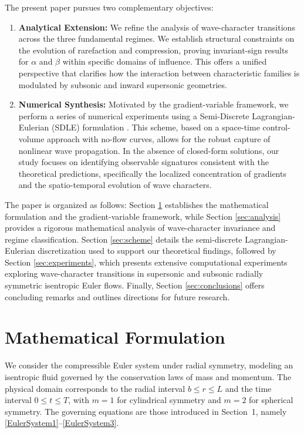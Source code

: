\documentclass[11pt]{article}
\begin{document}
The present paper pursues two complementary objectives:
\begin{enumerate}
    \item \textbf{Analytical Extension:} We refine the analysis of wave-character transitions across the three fundamental regimes. We establish structural constraints on the evolution of rarefaction and compression, proving invariant-sign results for $\alpha$ and $\beta$ within specific domains of influence. This offers a unified perspective that clarifies how the interaction between characteristic families is modulated by subsonic and inward supersonic geometries.
    \item \textbf{Numerical Synthesis:} Motivated by the gradient-variable framework, we perform a series of numerical experiments using a {Semi-Discrete Lagrangian-Eulerian (SDLE)} formulation \cite{ABREU_LE_LINEAR}. This scheme, based on a space-time control-volume approach with {no-flow curves}, allows for the robust capture of nonlinear wave propagation. In the absence of closed-form solutions, our study focuses on identifying observable signatures consistent with the theoretical predictions, specifically the localized concentration of gradients and the spatio-temporal evolution of wave characters.
\end{enumerate}

The paper is organized as follows: Section \ref{sec:formulation} establishes the mathematical formulation and the gradient-variable framework, while Section \ref{sec:analysis} provides a rigorous mathematical analysis of wave-character invariance and regime classification. Section \ref{sec:scheme} details the semi-discrete Lagrangian-Eulerian discretization used to support our theoretical findings, followed by Section \ref{sec:experiments}, which presents extensive computational experiments exploring wave-character transitions in supersonic and subsonic radially symmetric isentropic Euler flows. Finally, Section \ref{sec:conclusions} offers concluding remarks and outlines directions for future research.

\section{Mathematical Formulation}\label{sec:formulation}

We consider the compressible Euler system under radial symmetry, modeling an isentropic fluid governed by the conservation laws of mass and momentum. The physical domain corresponds to the radial interval \( b \leq r \leq L \) and the time interval \( 0 \leq t \leq T \), with \( m = 1 \) for cylindrical symmetry and \( m = 2 \) for spherical symmetry. The governing equations are those introduced in Section~1, namely \eqref{EulerSystem1}–\eqref{EulerSystem3}.
\end{document}
